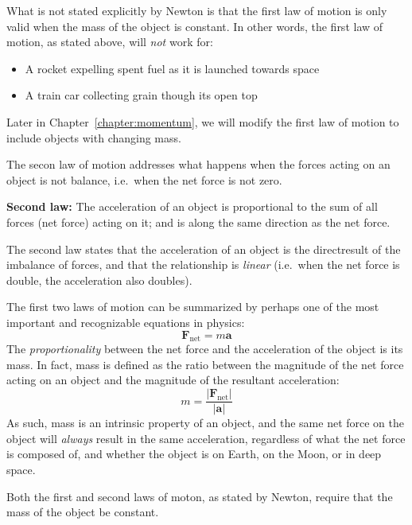What is not stated explicitly by Newton is that the first law of motion is only
valid when the mass of the object is constant. In other words, the first law of
motion, as stated above, will \emph{not} work for:
\begin{itemize}[itemsep=3pt]
\item A rocket expelling spent fuel as it is launched towards space
\item A train car collecting grain though its open top
\end{itemize}
Later in Chapter~\ref{chapter:momentum}, we will modify the first law of motion
to include objects with changing mass.


The secon law of motion addresses what happens when the forces acting on an
object is not balance, i.e.\ when the net force is not zero.

\begin{definition}
  \textbf{Second law:} The acceleration of an object is proportional to the
  sum of all forces (net force) acting on it; and is along the same
  direction as the net force.
\end{definition}
The second law states that the acceleration of an object is the directresult of
the imbalance of forces, and that the relationship is \emph{linear} (i.e.\ when
the net force is double, the acceleration also doubles).

The first two laws of motion can be summarized by perhaps one of the most
important and recognizable equations in physics:
\begin{equation}
  \boxed{\bm F_\text{net}=m\bm a}
\end{equation}
The \emph{proportionality} between the net force and the acceleration of the
object is its mass. In fact, mass is defined as the ratio between the magnitude
of the net force acting on an object and the magnitude of the resultant
acceleration:
\begin{equation}
  m=\frac{|\bm F_\text{net}|}{|\bm a|}
\end{equation}
As such, mass is an intrinsic property of an object, and the same net force on
the object will \emph{always} result in the same acceleration, regardless of
what the net force is composed of, and whether the object is on Earth, on the
Moon, or in deep space.

Both the first and second laws of moton, as stated by Newton, require that the
mass of the object be constant. 




